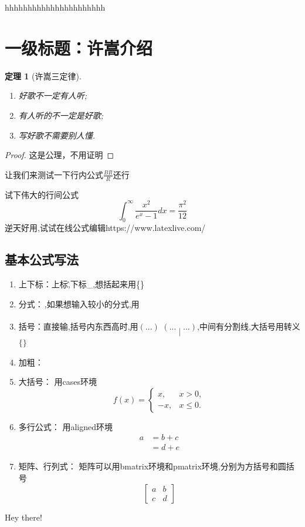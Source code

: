 \documentclass[UTF8,12pt,a4paper,oneside]{ctexart}
\newtheorem{theorem}{定理}[section]     %
\begin{document}
hhhhhhhhhhhhhhhhhhhhhh  

\section{一级标题：许嵩介绍}

\begin{theorem}[许嵩三定律]
    \begin{enumerate}
        \item 好歌不一定有人听;
        \item 有人听的不一定是好歌;
        \item 写好歌不需要别人懂.
    \end{enumerate}
\end{theorem}

\begin{proof}
    这是公理，不用证明
\end{proof}

让我们来测试一下行内公式$\frac{BIl}{R}$还行

试下伟大的行间公式
$$
\int_{0}^{\infty} \frac{x^2}{e^x-1} dx = \frac{\pi^2}{12}
$$
逆天好用,试试在线公式编辑https://www.latexlive.com/

\subsection{基本公式写法}
\begin{enumerate}
    \item 上下标：上标\^,下标\_,想括起来用\{\}
    \item 分式：$\dfrac{}{}$,如果想输入较小的分式,用$\frac{}{}$
    \item 括号：直接输\(\),括号内东西高时,用$\left(...\right)$
            $\left(...\middle|...\right)$,中间有分割线,大括号用转义$\{\}$
    \item 加粗：$\bm{}$
    \item 大括号：  用cases环境
                    $$
                    f(x)=\begin{cases}
                        x, & x>0, \\
                        -x, & x\leq 0.
                    \end{cases}
                    $$
    \item 多行公式： 用aligned环境
                    $$
                    \begin{aligned}
                    a & =b+c \\
                    & =d+e
                    \end{aligned}
                    $$
    \item 矩阵、行列式： 矩阵可以用bmatrix环境和pmatrix环境,分别为方括号和圆括号
                    $$
                    \begin{bmatrix}
                        a & b \\
                        c & d
                    \end{bmatrix}
                    $$
\end{enumerate}
Hey there!
\end{document}
